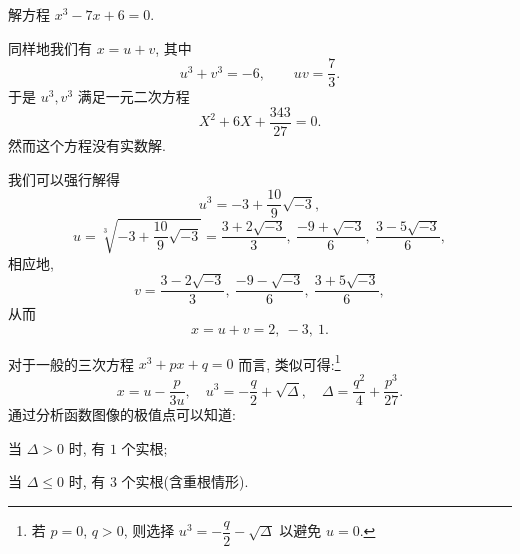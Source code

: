 \begin{example}
  解方程 $x^3-7x+6=0$.
\end{example}

\begin{solution}
  同样地我们有 $x=u+v$, 其中
  \[
    u^3+v^3=-6,\qquad uv=\frac73.
  \]
  于是 $u^3,v^3$ 满足一元二次方程
  \[
    X^2+6X+\frac{343}{27}=0.
  \]
  然而这个方程没有实数解.

  我们可以强行解得
  \[
    u^3=-3+\frac{10}9\sqrt{-3},
  \]
  \[
    u=\sqrt[3]{-3+\frac{10}9\sqrt{-3}}
     =\frac{3+2\sqrt{-3}}3,\ 
      \frac{-9+\sqrt{-3}}6,\ 
      \frac{3-5\sqrt{-3}}6,
  \]
  相应地,
  \[
    v=\frac{3-2\sqrt{-3}}3,\ 
      \frac{-9-\sqrt{-3}}6,\ 
      \frac{3+5\sqrt{-3}}6,
  \]
  从而
  \[
    x=u+v=2,\ -3,\ 1.
  \]
\end{solution}

对于一般的三次方程 $x^3+px+q=0$ 而言, 类似可得:\footnote{%
  若 $p=0$, $q>0$, 则选择 $u^3=-\dfrac q2-\sqrt{\Delta}$ 以避免 $u=0$.
}
\[
  x=u-\frac p{3u},\quad
  u^3=-\frac q2+\sqrt{\Delta},\quad
  \Delta=\frac{q^2}4+\frac{p^3}{27}.
\]
通过分析函数图像的极值点可以知道:
\begin{enuma}
  \item 当 $\Delta>0$ 时, 有 $1$ 个实根;
  \item 当 $\Delta\le0$ 时, 有 $3$ 个实根(含重根情形).
\end{enuma}

